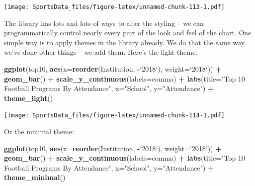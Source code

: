 \documentclass[]{book}
\newenvironment{Shaded}{\begin{snugshade}}{\end{snugshade}}
\newcommand{\KeywordTok}[1]{\textcolor[rgb]{0.13,0.29,0.53}{\textbf{#1}}}
\newcommand{\DataTypeTok}[1]{\textcolor[rgb]{0.13,0.29,0.53}{#1}}
\newcommand{\StringTok}[1]{\textcolor[rgb]{0.31,0.60,0.02}{#1}}
\newcommand{\OperatorTok}[1]{\textcolor[rgb]{0.81,0.36,0.00}{\textbf{#1}}}
\newcommand{\NormalTok}[1]{#1}
\begin{document}
\texttt{[image: SportsData\_files/figure-latex/unnamed-chunk-113-1.pdf]}

The library has lots and lots of ways to alter the styling -- we can
programmatically control nearly every part of the look and feel of the
chart. One simple way is to apply themes in the library already. We do
that the same way we've done other things -- we add them. Here's the
light theme.

\begin{Shaded}
\begin{Highlighting}[]
\KeywordTok{ggplot}\NormalTok{(top10, }\KeywordTok{aes}\NormalTok{(}\DataTypeTok{x=}\KeywordTok{reorder}\NormalTok{(Institution, }\OperatorTok{-}\StringTok{`}\DataTypeTok{2018}\StringTok{`}\NormalTok{), }\DataTypeTok{weight=}\StringTok{`}\DataTypeTok{2018}\StringTok{`}\NormalTok{)) }\OperatorTok{+}\StringTok{ }\KeywordTok{geom_bar}\NormalTok{() }\OperatorTok{+}\StringTok{ }\KeywordTok{scale_y_continuous}\NormalTok{(}\DataTypeTok{labels=}\NormalTok{comma) }\OperatorTok{+}\StringTok{ }\KeywordTok{labs}\NormalTok{(}\DataTypeTok{title=}\StringTok{"Top 10 Football Programs By Attendance"}\NormalTok{, }\DataTypeTok{x=}\StringTok{"School"}\NormalTok{, }\DataTypeTok{y=}\StringTok{"Attendance"}\NormalTok{) }\OperatorTok{+}\StringTok{ }\KeywordTok{theme_light}\NormalTok{()}
\end{Highlighting}
\end{Shaded}

\texttt{[image: SportsData\_files/figure-latex/unnamed-chunk-114-1.pdf]}

Or the minimal theme:

\begin{Shaded}
\begin{Highlighting}[]
\KeywordTok{ggplot}\NormalTok{(top10, }\KeywordTok{aes}\NormalTok{(}\DataTypeTok{x=}\KeywordTok{reorder}\NormalTok{(Institution, }\OperatorTok{-}\StringTok{`}\DataTypeTok{2018}\StringTok{`}\NormalTok{), }\DataTypeTok{weight=}\StringTok{`}\DataTypeTok{2018}\StringTok{`}\NormalTok{)) }\OperatorTok{+}\StringTok{ }\KeywordTok{geom_bar}\NormalTok{() }\OperatorTok{+}\StringTok{ }\KeywordTok{scale_y_continuous}\NormalTok{(}\DataTypeTok{labels=}\NormalTok{comma) }\OperatorTok{+}\StringTok{ }\KeywordTok{labs}\NormalTok{(}\DataTypeTok{title=}\StringTok{"Top 10 Football Programs By Attendance"}\NormalTok{, }\DataTypeTok{x=}\StringTok{"School"}\NormalTok{, }\DataTypeTok{y=}\StringTok{"Attendance"}\NormalTok{) }\OperatorTok{+}\StringTok{ }\KeywordTok{theme_minimal}\NormalTok{()}
\end{Highlighting}
\end{Shaded}
\end{document}
